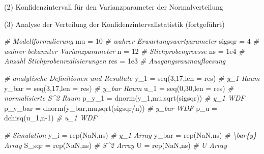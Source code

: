 \documentclass[
  8pt,
  ignorenonframetext,
]{beamer}
\newenvironment{Shaded}{\begin{snugshade}}{\end{snugshade}}
\newcommand{\AttributeTok}[1]{\textcolor[rgb]{0.77,0.63,0.00}{#1}}
\newcommand{\CommentTok}[1]{\textcolor[rgb]{0.56,0.35,0.01}{\textit{#1}}}
\newcommand{\ConstantTok}[1]{\textcolor[rgb]{0.00,0.00,0.00}{#1}}
\newcommand{\DecValTok}[1]{\textcolor[rgb]{0.00,0.00,0.81}{#1}}
\newcommand{\FloatTok}[1]{\textcolor[rgb]{0.00,0.00,0.81}{#1}}
\newcommand{\FunctionTok}[1]{\textcolor[rgb]{0.00,0.00,0.00}{#1}}
\newcommand{\NormalTok}[1]{#1}
\newcommand{\OtherTok}[1]{\textcolor[rgb]{0.56,0.35,0.01}{#1}}
\newcommand{\SpecialCharTok}[1]{\textcolor[rgb]{0.00,0.00,0.00}{#1}}
\begin{document}
\begin{frame}[fragile]{(2) Konfidenzintervall für den Varianzparameter
der Normalverteilung}
\protect\hypertarget{konfidenzintervall-fuxfcr-den-varianzparameter-der-normalverteilung-1}{}
\normalsize

\noindent (3) Analyse der Verteilung der Konfidenzintervallstatistik
(fortgeführt) \vspace{2mm}

\tiny
{}

\begin{Shaded}
\begin{Highlighting}[]
\CommentTok{\# Modellformulierung}
\NormalTok{mu      }\OtherTok{=} \DecValTok{10}                                    \CommentTok{\# wahrer Erwartungswertparameter}
\NormalTok{sigsqr  }\OtherTok{=} \DecValTok{4}                                     \CommentTok{\# wahrer bekannter Varianzparameter}
\NormalTok{n       }\OtherTok{=} \DecValTok{12}                                    \CommentTok{\# Stichprobengroesse}
\NormalTok{ns      }\OtherTok{=} \FloatTok{1e4}                                   \CommentTok{\# Anzahl Stichprobenrealisierungen}
\NormalTok{res     }\OtherTok{=} \FloatTok{1e3}                                   \CommentTok{\# Ausgangsraumaufloesung}

\CommentTok{\# analytische Definitionen und Resultate}
\NormalTok{y\_1     }\OtherTok{=} \FunctionTok{seq}\NormalTok{(}\DecValTok{3}\NormalTok{,}\DecValTok{17}\NormalTok{,}\AttributeTok{len =}\NormalTok{ res)                   }\CommentTok{\# y\_1 Raum}
\NormalTok{y\_bar   }\OtherTok{=} \FunctionTok{seq}\NormalTok{(}\DecValTok{3}\NormalTok{,}\DecValTok{17}\NormalTok{,}\AttributeTok{len =}\NormalTok{ res)                   }\CommentTok{\# y\_bar Raum}
\NormalTok{u\_1     }\OtherTok{=} \FunctionTok{seq}\NormalTok{(}\DecValTok{0}\NormalTok{,}\DecValTok{30}\NormalTok{,}\AttributeTok{len =}\NormalTok{ res)                   }\CommentTok{\# normalisierte S\^{}2 Raum}
\NormalTok{p\_y\_1   }\OtherTok{=} \FunctionTok{dnorm}\NormalTok{(y\_1,mu,}\FunctionTok{sqrt}\NormalTok{(sigsqr))            }\CommentTok{\# y\_1 WDF}
\NormalTok{p\_y\_bar }\OtherTok{=} \FunctionTok{dnorm}\NormalTok{(y\_bar,mu,}\FunctionTok{sqrt}\NormalTok{(sigsqr}\SpecialCharTok{/}\NormalTok{n))        }\CommentTok{\# y\_bar WDF}
\NormalTok{p\_u     }\OtherTok{=} \FunctionTok{dchisq}\NormalTok{(u\_1,n}\DecValTok{{-}1}\NormalTok{)                       }\CommentTok{\# u\_1 WDF}

\CommentTok{\# Simulation}
\NormalTok{y\_i     }\OtherTok{=} \FunctionTok{rep}\NormalTok{(}\ConstantTok{NaN}\NormalTok{,ns)                           }\CommentTok{\# y\_1 Array}
\NormalTok{y\_bar   }\OtherTok{=} \FunctionTok{rep}\NormalTok{(}\ConstantTok{NaN}\NormalTok{,ns)                           }\CommentTok{\# \textbackslash{}bar\{y\} Array}
\NormalTok{S\_sqr   }\OtherTok{=} \FunctionTok{rep}\NormalTok{(}\ConstantTok{NaN}\NormalTok{,ns)                           }\CommentTok{\# S\^{}2 Array}
\NormalTok{U       }\OtherTok{=} \FunctionTok{rep}\NormalTok{(}\ConstantTok{NaN}\NormalTok{,ns)                           }\CommentTok{\# U Array}


\end{Highlighting}
\end{Shaded}
\end{frame}
\end{document}
